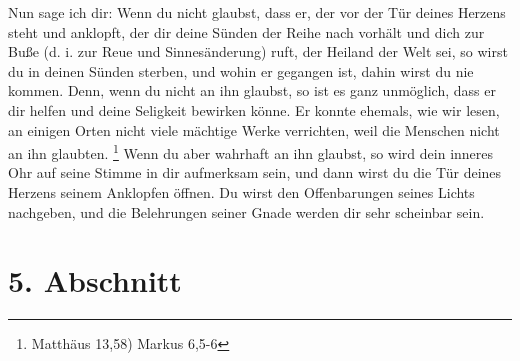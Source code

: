 Nun sage ich dir: Wenn du nicht glaubst, dass er, der vor der Tür deines Herzens
steht und anklopft, der dir deine Sünden der Reihe nach vorhält und dich zur
Buße (d. i. zur Reue und Sinnesänderung) ruft, der Heiland der Welt sei, so
wirst du in deinen Sünden sterben, und wohin er gegangen ist, dahin wirst du nie
kommen. Denn, wenn du nicht an ihn glaubst, so ist es ganz unmöglich, dass er dir
helfen und deine Seligkeit bewirken könne. Er konnte ehemals, wie wir lesen, an
einigen Orten nicht viele mächtige Werke verrichten, weil die Menschen nicht an
ihn glaubten.
\footnote{Matthäus 13,58) Markus 6,5-6}
Wenn du aber wahrhaft an ihn
glaubst, so wird dein inneres Ohr auf seine Stimme in dir aufmerksam sein, und
dann wirst du die Tür deines Herzens seinem Anklopfen öffnen. Du wirst den
Offenbarungen seines Lichts nachgeben, und die Belehrungen seiner Gnade werden
dir sehr scheinbar sein.

\section{5. Abschnitt}  \label{kap2_ab5}

